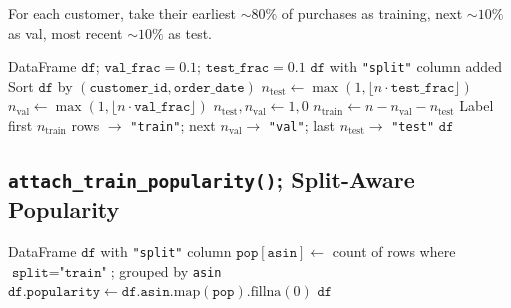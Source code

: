 \documentclass[11pt,a4paper]{article}
\begin{document}
For each customer, take their earliest ${\sim}80\%$ of purchases as training, next ${\sim}10\%$ as val, most recent ${\sim}10\%$ as test.

\begin{algorithm}[H]
\caption{\textsc{TemporalSplit}}\label{alg:temporal-split}
\begin{algorithmic}[1]
\Require DataFrame $\texttt{df}$; $\texttt{val\_frac}=0.1$; $\texttt{test\_frac}=0.1$
\Ensure $\texttt{df}$ with \texttt{"split"} column added
\State Sort $\texttt{df}$ by $(\texttt{customer\_id}, \texttt{order\_date})$
    \State \hspace{2em} $n_{\text{test}} \gets \max(1, \lfloor n \cdot \texttt{test\_frac} \rfloor)$
    \State \hspace{2em} $n_{\text{val}} \gets \max(1, \lfloor n \cdot \texttt{val\_frac} \rfloor)$
        \State \hspace{2em} \hspace{2em} $n_{\text{test}}, n_{\text{val}} \gets 1, 0$ 
    \EndIf
    \State \hspace{2em} $n_{\text{train}} \gets n - n_{\text{val}} - n_{\text{test}}$
    \State \hspace{2em} Label first $n_{\text{train}}$ rows $\to$ \texttt{"train"}; next $n_{\text{val}} \to$ \texttt{"val"}; last $n_{\text{test}} \to$ \texttt{"test"}
\EndFor
\State \Return $\texttt{df}$
\end{algorithmic}
\end{algorithm}


\subsection{\texttt{attach\_train\_popularity()}; Split-Aware Popularity}

\begin{algorithm}[H]
\caption{\textsc{AttachTrainPopularity}}\label{alg:attach-pop}
\begin{algorithmic}[1]
\Require DataFrame $\texttt{df}$ with \texttt{"split"} column
\State \hspace{2em} $\texttt{pop}[\texttt{asin}] \gets$ count of rows where $\texttt{split} = \texttt{"train"}$; grouped by \texttt{asin}
\State \hspace{2em} $\texttt{df.popularity} \gets \texttt{df.asin}.\text{map}(\texttt{pop}).\text{fillna}(0)$
\State \Return $\texttt{df}$
\end{algorithmic}
\end{algorithm}
\end{document}
